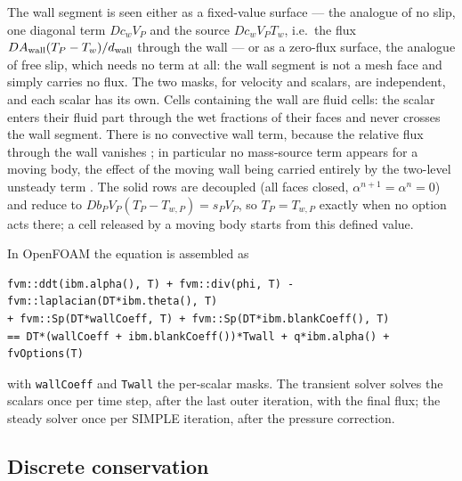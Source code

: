 \documentclass[11pt,a4paper]{article}
\theoremstyle{remark}
\newcommand{\Aw}{A_{\rm wall}}
\newcommand{\dw}{d_{\rm wall}}
\newcommand{\code}[1]{\texttt{#1}}
\begin{document}
The wall segment is seen either as a fixed-value surface --- the analogue of no slip, one
diagonal term $Dc_wV_P$ and the source $Dc_wV_PT_w$, i.e.\ the flux $D\Aw(T_P-T_w)/\dw$ through
the wall --- or as a zero-flux surface, the analogue of free slip, which needs no term at all:
the wall segment is not a mesh face and simply carries no flux. The two masks, for velocity and
scalars, are independent, and each scalar has its own. Cells containing the wall are fluid
cells: the scalar enters their fluid part through the wet fractions of their faces and never
crosses the wall segment. There is no convective wall term, because the relative flux through
the wall vanishes%
; in particular no mass-source term appears for a moving body, the effect of the
moving wall being carried entirely by the two-level unsteady term%
. The solid rows are decoupled (all faces closed, $\alpha^{n+1}=\alpha^n=0$) and reduce to
$Db_PV_P(T_P-T_{w,P})=s_PV_P$, so $T_P=T_{w,P}$ exactly when no option acts there; a cell
released by a moving body starts from this defined value.

In OpenFOAM the equation is assembled as
\begin{lstlisting}
fvm::ddt(ibm.alpha(), T) + fvm::div(phi, T) - fvm::laplacian(DT*ibm.theta(), T)
+ fvm::Sp(DT*wallCoeff, T) + fvm::Sp(DT*ibm.blankCoeff(), T)
== DT*(wallCoeff + ibm.blankCoeff())*Twall + q*ibm.alpha() + fvOptions(T)
\end{lstlisting}
with \code{wallCoeff} and \code{Twall} the per-scalar masks. The transient solver solves the
scalars once per time step, after the last outer iteration, with the final flux; the steady
solver once per SIMPLE iteration, after the pressure correction.

\subsection{Discrete conservation}
\end{document}
